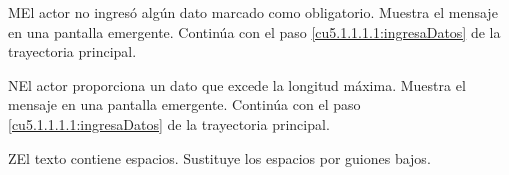  \begin{UCtrayectoriaA}{M}{El actor no ingresó algún dato marcado como obligatorio.}
    \UCpaso[\UCsist] Muestra el mensaje  en una pantalla emergente.
    \UCpaso[] Continúa con el paso \ref{cu5.1.1.1.1:ingresaDatos} de la trayectoria principal.
 \end{UCtrayectoriaA}
 
 \begin{UCtrayectoriaA}{N}{El actor proporciona un dato que excede la longitud máxima.}
    \UCpaso[\UCsist] Muestra el mensaje  en una pantalla emergente.
    \UCpaso[] Continúa con el paso \ref{cu5.1.1.1.1:ingresaDatos} de la trayectoria principal.
 \end{UCtrayectoriaA}

  \begin{UCtrayectoriaA}{Z}{El texto contiene espacios.}
     \UCpaso[\UCsist] Sustituye los espacios por guiones bajos.
  \end{UCtrayectoriaA}